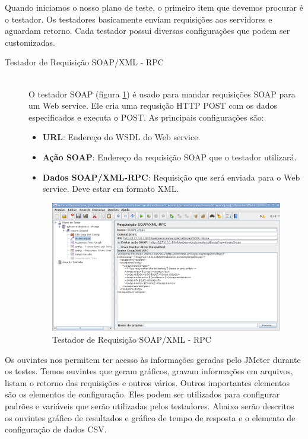Quando iniciamos o nosso plano de teste, o primeiro item que devemos procurar é o testador. Os testadores basicamente enviam requisições aos servidores e aguardam retorno. Cada testador possui diversas configurações que podem ser customizadas.

\begin{description}
\item[ Testador de Requisição SOAP/XML - RPC] \hfill \\

O testador SOAP (figura \ref{fig:testador_insere_orgao}) é usado para mandar requisições SOAP para um Web service.  Ele cria uma requsição HTTP POST com os dados especificados e executa o POST.  As principais configurações são:


\begin{itemize}
\item \textbf{URL}:  Endereço do WSDL do Web service.
\item \textbf{Ação SOAP}: Endereço da requisição SOAP que o testador utilizará.
\item \textbf{Dados SOAP/XML-RPC}: Requisição que será enviada para o Web service. Deve estar em formato XML.
\end{itemize}

	\begin{figure}[!htbp]
		\begin{center}
			\includegraphics[width=1\textwidth]{testador_insere_orgao}
		\end{center}
		\caption{Testador de Requisição SOAP/XML - RPC}
		\label{fig:testador_insere_orgao}
	\end{figure}
	
\end{description}

Os ouvintes nos permitem ter acesso às informações geradas pelo JMeter durante os testes. Temos ouvintes que geram gráficos, gravam informações em arquivos, listam o retorno das requisições e outros vários. Outros importantes elementos são  os elementos de configuração. Eles podem ser utilizados para configurar padrões e variáveis que serão utilizadas pelos testadores. Abaixo serão descritos os ouvintes gráfico de resultados e gráfico de tempo de resposta e o elemento de configuração de dados CSV.

